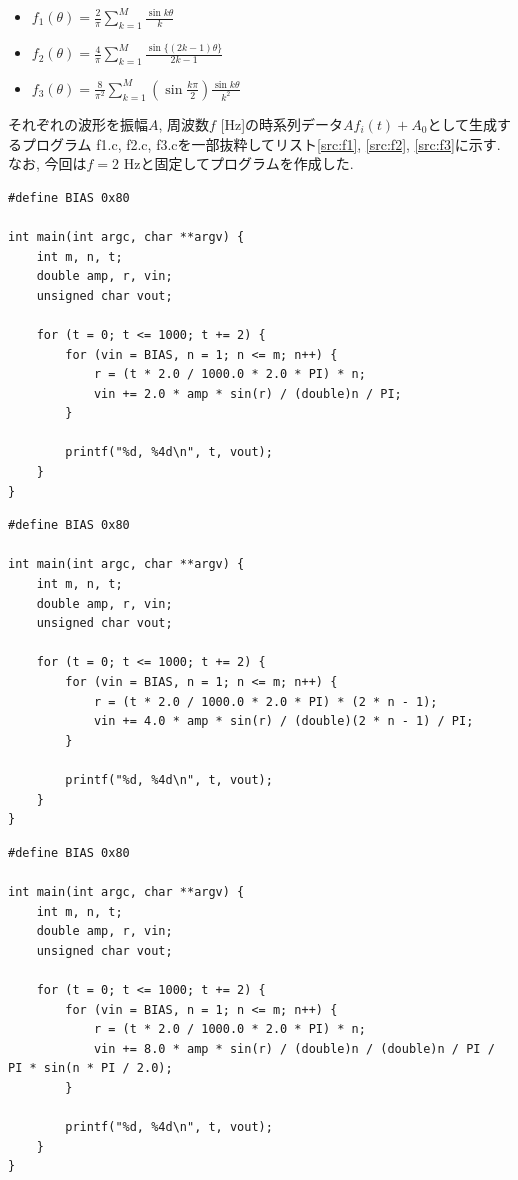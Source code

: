 \documentclass[titlepage]{jsarticle}
\begin{document}
    \begin{itemize}
        \item $\displaystyle f_1(\theta) = \frac{2}{\pi} \sum^M_{k = 1}\frac{\sin{k \theta}}{k}$
        \item $\displaystyle f_2(\theta) = \frac{4}{\pi} \sum^M_{k = 1}\frac{\sin{\{(2k - 1) \theta}\}}{2k - 1}$
        \item $\displaystyle f_3(\theta) = \frac{8}{\pi^2} \sum^M_{k = 1} \left(\sin{\frac{k\pi}{2}}\right) \frac{\sin{k\theta}}{k^2}$
    \end{itemize}

    それぞれの波形を振幅$A$, 周波数$f$ [Hz]の時系列データ$Af_i(t) + A_0$として生成するプログラム
    f1.c, f2.c, f3.cを一部抜粋してリスト\ref{src:f1}, \ref{src:f2}, \ref{src:f3}に示す.
    なお, 今回は$f = 2$ Hzと固定してプログラムを作成した.

    \begin{lstlisting}[caption=f1.c, label=src:f1]
#define BIAS 0x80
        
int main(int argc, char **argv) {
    int m, n, t;
    double amp, r, vin;
    unsigned char vout;

    for (t = 0; t <= 1000; t += 2) {
        for (vin = BIAS, n = 1; n <= m; n++) {
            r = (t * 2.0 / 1000.0 * 2.0 * PI) * n;
            vin += 2.0 * amp * sin(r) / (double)n / PI;
        }

        printf("%d, %4d\n", t, vout);
    }
}\end{lstlisting}

    \begin{lstlisting}[caption=f2.c, label=src:f2]
#define BIAS 0x80

int main(int argc, char **argv) {
    int m, n, t;
    double amp, r, vin;
    unsigned char vout;

    for (t = 0; t <= 1000; t += 2) {
        for (vin = BIAS, n = 1; n <= m; n++) {
            r = (t * 2.0 / 1000.0 * 2.0 * PI) * (2 * n - 1);
            vin += 4.0 * amp * sin(r) / (double)(2 * n - 1) / PI;
        }

        printf("%d, %4d\n", t, vout);
    }
}\end{lstlisting}

    \begin{lstlisting}[caption=f3.c, label=src:f3]
#define BIAS 0x80

int main(int argc, char **argv) {
    int m, n, t;
    double amp, r, vin;
    unsigned char vout;

    for (t = 0; t <= 1000; t += 2) {
        for (vin = BIAS, n = 1; n <= m; n++) {
            r = (t * 2.0 / 1000.0 * 2.0 * PI) * n;
            vin += 8.0 * amp * sin(r) / (double)n / (double)n / PI / PI * sin(n * PI / 2.0);
        }
        
        printf("%d, %4d\n", t, vout);
    }
}\end{lstlisting}
\end{document}
